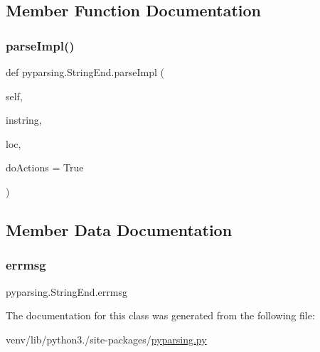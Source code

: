 \subsection{Member Function Documentation}
\mbox{\label{classpyparsing_1_1StringEnd_a2038c17dfb0d6764fa8c52c784c60e59}} 
\subsubsection{\texorpdfstring{parse\+Impl()}{parseImpl()}}
{\footnotesize\ttfamily def pyparsing.\+String\+End.\+parse\+Impl (\begin{DoxyParamCaption}\item[{}]{self,  }\item[{}]{instring,  }\item[{}]{loc,  }\item[{}]{do\+Actions = {\ttfamily True} }\end{DoxyParamCaption})}



\subsection{Member Data Documentation}
\mbox{\label{classpyparsing_1_1StringEnd_adf5f3e56762c9c915b9cb1c16e83bb64}} 
\subsubsection{\texorpdfstring{errmsg}{errmsg}}
{\footnotesize\ttfamily pyparsing.\+String\+End.\+errmsg}



The documentation for this class was generated from the following file\+:\begin{DoxyCompactItemize}
\item 
venv/lib/python3./site-\/packages/\hyperlink{pyparsing_8py}{pyparsing.\+py}\end{DoxyCompactItemize}
